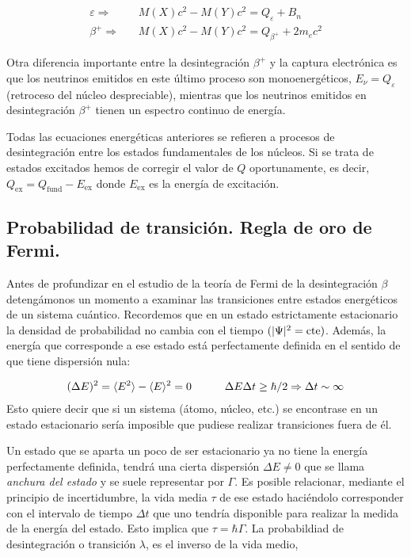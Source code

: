 \begin{equation}
\begin{split}
\varepsilon \Longrightarrow \ \ & \ \ M(X)c^2 - M(Y)c^2 = Q_\varepsilon + B_n\\
\beta^+ \Longrightarrow \ \ & \ \ M(X)c^2- M(Y)c^2  = Q_{\beta^+} + 2m_ec^2
\end{split}
\end{equation}

Otra diferencia importante entre la desintegración $\beta^+$ y la captura electrónica es que los neutrinos emitidos en este último proceso son monoenergéticos, $E_\nu=Q_\varepsilon$ (retroceso del núcleo despreciable), mientras que los neutrinos emitidos en desintegración $\beta^+$ tienen un espectro continuo de energía.

Todas las ecuaciones energéticas anteriores se refieren a procesos de desintegración entre los estados fundamentales de los núcleos. Si se trata de estados excitados hemos de corregir el valor de $Q$ oportunamente, es decir, $Q_{\text{ex}} = Q_{\text{fund}}-E_{\text{ex}}$ donde $E_{\text{ex}}$ es la energía de excitación.



\subsection{Probabilidad de transición. Regla de oro de Fermi.}

Antes de profundizar en el estudio de la teoría de Fermi de la desintegración $\beta$ detengámonos un momento a examinar las transiciones entre estados energéticos de un sistema cuántico. Recordemos que en un estado estrictamente estacionario la densidad de probabilidad no cambia con el tiempo $(|\Psi|^2 = \text{cte})$. Además, la energía que corresponde a ese estado está perfectamente definida en el sentido de que tiene dispersión nula:

\begin{eqnarray}
	(\Delta E)^2 = \langle E^2 \rangle - \langle E \rangle^2 = 0 \quad \quad \quad \Delta E \Delta t \geq \hbar / 2 \Rightarrow \Delta t \sim \infty
\end{eqnarray}
Esto quiere decir que si un sistema (átomo, núcleo, etc.) se encontrase en un estado estacionario sería imposible que pudiese realizar transiciones fuera de él. %


Un estado que se aparta un poco de ser estacionario ya no tiene la energía perfectamente definida, tendrá una cierta dispersión $\Delta E \neq 0$ que se llama \textit{anchura del estado} y se suele representar por $\Gamma$. Es posible relacionar, mediante el principio de incertidumbre, la vida media $\tau$ de ese estado haciéndolo corresponder con el intervalo de tiempo $\Delta t$ que uno tendría disponible para realizar la medida de la energía del estado. Esto implica que $\tau=\hbar \Gamma$. La probabildiad de desintegración o transición $\lambda$, es el inverso de la vida medio,

